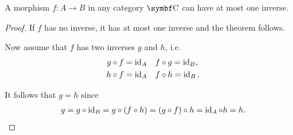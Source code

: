 \begin{proposition}\label{thm:at_most_one_isomorphism}\cite[exercise 1.1.13]{Leinster2014}
  A morphism \( f: A \to B \) in any category \( \Bold C \) can have at most one inverse.
\end{proposition}
\begin{proof}
  If \( f \) has no inverse, it has at most one inverse and the theorem follows.

  Now assume that \( f \) has two inverses \( g \) and \( h \), i.e.
  \begin{align*}
    g \circ f = \operatorname{id}_A && &f \circ g = \operatorname{id}_B,
    \\
    h \circ f = \operatorname{id}_A && &f \circ h = \operatorname{id}_B.
  \end{align*}

  It follows that \( g = h \) since
  \begin{align*}
    g
    =
    g \circ \operatorname{id}_B
    =
    g \circ (f \circ h)
    =
    (g \circ f) \circ h
    =
    \operatorname{id}_A \circ h
    =
    h.
  \end{align*}
\end{proof}

